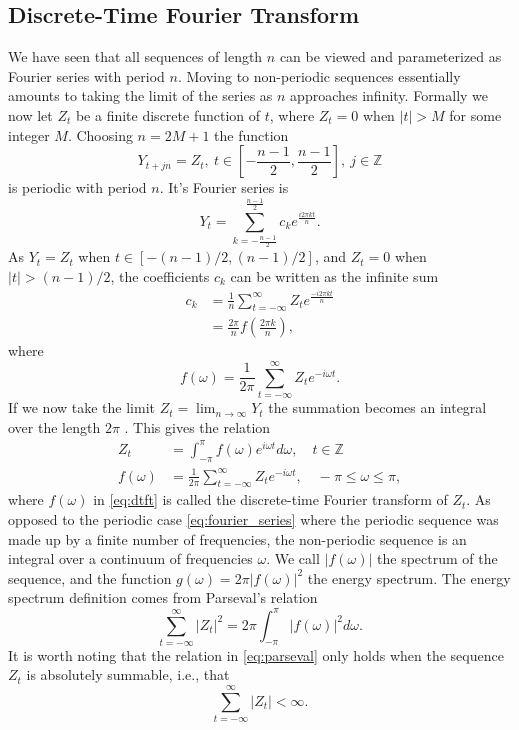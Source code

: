 \documentclass[a4paper]{memoir}
\theoremstyle{plain}
\theoremstyle{definition}
\theoremstyle{remark}
\begin{document}
\subsection{Discrete-Time Fourier Transform}
We have seen that all sequences of length $n$ can be viewed and parameterized as Fourier series with period $n$.
Moving to non-periodic sequences essentially amounts to taking the limit of the series as $n$ approaches infinity.
Formally we now let $Z_t$ be a finite discrete function of $t$, where $Z_t = 0$ when $|t| > M$ for some integer $M$.
Choosing $n = 2M + 1$ the function
\begin{equation*}
        Y_{t + jn} = Z_t, \ t \in \left[ -\frac{n-1}{2}, \frac{n-1}{2} \right], \ j \in \mathbb{Z}
\end{equation*}
is periodic with period $n$.
It's Fourier series is 
\begin{equation*}
        Y_t = \sum_{k = -\frac{n - 1}{2}}^{\frac{n -1 }{2}} c_k e^{\frac{i2 \pi kt}{n}}.
\end{equation*}
As $Y_t = Z_t$ when $t \in [-(n-1)/2, (n-1)/2]$, and $Z_t = 0$ when $|t| > (n-1)/2$, the coefficients $c_k$ can be written as the infinite sum
\begin{align*}
        c_k &= \frac{1}{n}\sum_{t = - \infty}^{\infty} Z_t e^{\frac{-i2\pi kt}{n}} \\
        & = \frac{2 \pi}{n}f\left(\frac{2\pi k}{n}\right),
\end{align*}
where 
\begin{equation*}
        f(\omega) = \frac{1}{2\pi} \sum_{t = -\infty}^{\infty} Z_t e^{-i\omega t}.
\end{equation*}
If we now take the limit $Z_t = \lim_{n \rightarrow \infty} Y_t$ the summation becomes an integral over the length $2\pi$ \cite{wei}.
This gives the relation
\begin{align}\label{eq:dtft_inv}
        Z_t &= \int_{-\pi}^{\pi} f(\omega) e^{i\omega t} d\omega, \quad t \in \mathbb{Z} \\
        \label{eq:dtft}
        f(\omega) &= \frac{1}{2 \pi} \sum_{t = -\infty}^{\infty} Z_t e^{-i \omega t}, \quad -\pi \leq \omega \leq \pi,
\end{align}
where $f(\omega)$ in \eqref{eq:dtft} is called the discrete-time Fourier transform of $Z_t$.
As opposed to the periodic case \eqref{eq:fourier_series} where the periodic sequence was made up by a finite number of frequencies, the non-periodic sequence is an integral over a continuum of frequencies $\omega$.
We call $|f(\omega)|$ the spectrum of the sequence, and the function $g(\omega) = 2 \pi |f(\omega)|^2$ the energy spectrum.
The energy spectrum definition comes from Parseval's relation 
\begin{equation}\label{eq:parseval}
        \sum_{t = -\infty}^{\infty} |Z_t|^2 = 2 \pi \int_{- \pi}^{\pi}|f(\omega)|^2 d\omega.
\end{equation}
It is worth noting that the relation in \eqref{eq:parseval} only holds when the sequence $Z_t$ is absolutely summable, i.e., that
\begin{equation}\label{eq:absuletly_summable}
        \sum_{ t = -\infty}^{\infty}|Z_t| < \infty.
\end{equation}
\end{document}
